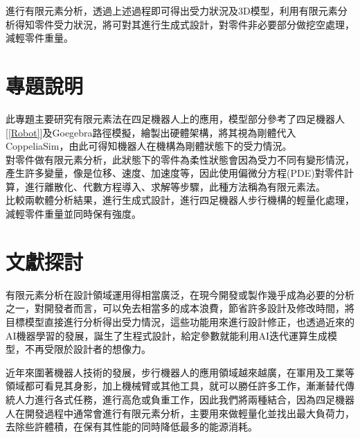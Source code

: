 進行有限元素分析，透過上述過程即可得出受力狀況及3D模型，利用有限元素分析得知零件受力狀況，將可對其進行生成式設計，對零件非必要部分做挖空處理，減輕零件重量。\
\newpage
\section{專題說明}
此專題主要研究有限元素法在四足機器人上的應用，模型部分參考了四足機器人[\ref{Robot}]及Goegebra路徑模擬，繪製出硬體架構，將其視為剛體代入CoppeliaSim，由此可得知機器人在機構為剛體狀態下的受力情況。\\

對零件做有限元素分析，此狀態下的零件為柔性狀態會因為受力不同有變形情況，產生許多變量，像是位移、速度、加速度等，因此使用偏微分方程(PDE)對零件計算，進行離散化、代數方程導入、求解等步驟，此種方法稱為有限元素法。\\

比較兩軟體分析結果，進行生成式設計，進行四足機器人步行機構的輕量化處理，減輕零件重量並同時保有強度。\\

\section{文獻探討}

有限元素分析在設計領域運用得相當廣泛，在現今開發或製作幾乎成為必要的分析之一，對開發者而言，可以免去相當多的成本浪費，節省許多設計及修改時間，將目標模型直接進行分析得出受力情況，這些功能用來進行設計修正，也透過近來的AI機器學習的發展，誕生了生程式設計，給定參數就能利用AI迭代運算生成模型，不再受限於設計者的想像力。\

近年來圍著機器人技術的發展，步行機器人的應用領域越來越廣，在軍用及工業等領域都可看見其身影，加上機械臂或其他工具，就可以勝任許多工作，漸漸替代傳統人力進行各式任務，進行高危或負重工作，因此我們將兩種結合，因為四足機器人在開發過程中通常會進行有限元素分析，主要用來做輕量化並找出最大負荷力，去除些許體積，在保有其性能的同時降低最多的能源消耗。\
\newpage

\renewcommand{\baselinestretch}{0.5} %
